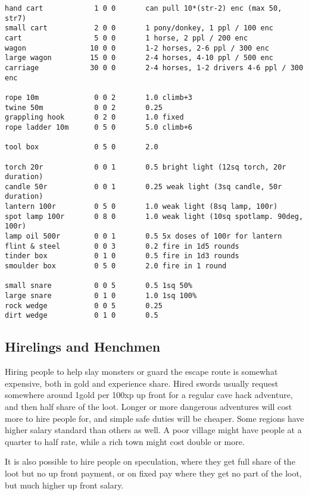 \begin{verbatim}
hand cart            1 0 0       can pull 10*(str-2) enc (max 50, str7)
small cart           2 0 0       1 pony/donkey, 1 ppl / 100 enc
cart                 5 0 0       1 horse, 2 ppl / 200 enc
wagon               10 0 0       1-2 horses, 2-6 ppl / 300 enc
large wagon         15 0 0       2-4 horses, 4-10 ppl / 500 enc
carriage            30 0 0       2-4 horses, 1-2 drivers 4-6 ppl / 300 enc

rope 10m             0 0 2       1.0 climb+3
twine 50m            0 0 2       0.25
grappling hook       0 2 0       1.0 fixed
rope ladder 10m      0 5 0       5.0 climb+6

tool box             0 5 0       2.0

torch 20r            0 0 1       0.5 bright light (12sq torch, 20r duration)
candle 50r           0 0 1       0.25 weak light (3sq candle, 50r duration)
lantern 100r         0 5 0       1.0 weak light (8sq lamp, 100r)
spot lamp 100r       0 8 0       1.0 weak light (10sq spotlamp. 90deg, 100r)
lamp oil 500r        0 0 1       0.5 5x doses of 100r for lantern
flint & steel        0 0 3       0.2 fire in 1d5 rounds
tinder box           0 1 0       0.5 fire in 1d3 rounds
smoulder box         0 5 0       2.0 fire in 1 round

small snare          0 0 5       0.5 1sq 50%
large snare          0 1 0       1.0 1sq 100%
rock wedge           0 0 5       0.25
dirt wedge           0 1 0       0.5

\end{verbatim} %
\normalsize



\subsection*{Hirelings and Henchmen}
Hiring people to help slay monsters or guard the escape route is somewhat expensive, both in gold and experience share. Hired swords usually request somewhere around 1gold per 100xp up front for a regular cave hack adventure, and then half share of the loot. Longer or more dangerous adventures will cost more to hire people for, and simple safe duties will be cheaper. Some regions have higher salary standard than others as well. A poor village might have people at a quarter to half rate, while a rich town might cost double or more.

It is also possible to hire people on speculation, where they get full share of the loot but no up front payment, or on fixed pay where they get no part of the loot, but much higher up front salary.

